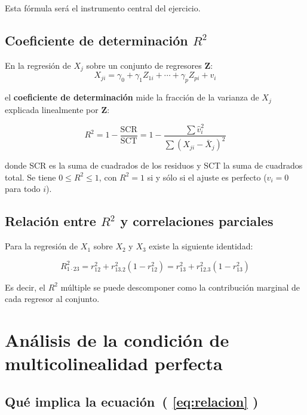 \documentclass[12pt, letterpaper]{article}
\theoremstyle{remark}
\newcommand{\Rd}[2]{R^2_{#1 \cdot #2}} %
\begin{document}
\noindent Esta fórmula será el instrumento central del ejercicio.

\subsection{Coeficiente de determinación $R^2$}

En la regresión de $X_j$ sobre un conjunto de regresores $\mathbf{Z}$:
\begin{equation}
  X_{ji} = \gamma_0 + \gamma_1 Z_{1i} + \cdots + \gamma_p Z_{pi} + v_i
  \label{eq:reg_gen}
\end{equation}

\noindent el \textbf{coeficiente de determinación} mide la fracción de la varianza
de $X_j$ explicada linealmente por $\mathbf{Z}$:

\begin{equation}
  R^2 = 1 - \frac{\text{SCR}}{\text{SCT}}
       = 1 - \frac{\sum \hat{v}_i^2}{\sum (X_{ji}-\bar{X}_j)^2}
  \label{eq:R2_def}
\end{equation}

\noindent donde SCR es la suma de cuadrados de los residuos y SCT la suma de
cuadrados total. Se tiene $0 \le R^2 \le 1$, con $R^2 = 1$ si y sólo si
el ajuste es perfecto ($\hat{v}_i = 0$ para todo $i$).

\subsection{Relación entre $R^2$ y correlaciones parciales}

Para la regresión de $X_1$ sobre $X_2$ y $X_3$ existe la siguiente identidad:

\begin{equation}
  \Rd{1}{23}
    = r_{12}^2 + r_{13.2}^2(1 - r_{12}^2)
    = r_{13}^2 + r_{12.3}^2(1 - r_{13}^2)
  \label{eq:R2_parciales}
\end{equation}

\noindent Es decir, el $R^2$ múltiple se puede descomponer como la contribución
marginal de cada regresor al conjunto.

\section{Análisis de la condición de multicolinealidad perfecta}

\subsection{Qué implica la ecuación~( \ref{eq:relacion} )}
\end{document}
